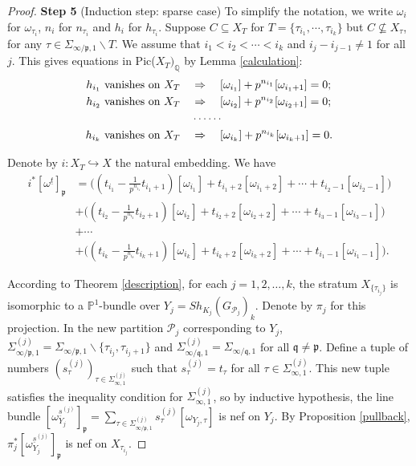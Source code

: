 \documentclass{article}
\begin{document}
\begin{proof}
\medskip
\noindent
\textbf{Step 5} (Induction step: sparse case) To simplify the notation, we write $\omega_i$ for $\omega_{\tau_i}$, $n_i$ for $n_{\tau_i}$ and $h_i$ for $h_{\tau_i}$. Suppose $C\subseteq X_T$ for $T=\{\tau_{i_1},\cdots,\tau_{i_k} \}$ but $C\nsubseteq X_\tau$, for any $\tau\in \Sigma_{\infty/\mathfrak{p},1}\backslash T$. We assume that $i_1<i_2<\cdots< i_k$ and $i_j-i_{j-1}\ne1$ for all $j$. This gives equations in Pic($X_T)_{\mathbb{Q}}$ by Lemma \ref{calculation}:
\begin{equation}
\begin{aligned}
h_{i_1}\ \textnormal{vanishes on $X_T$}\quad &\Rightarrow\quad [\omega_{i_1}]+p^{n_{i_1}}[\omega_{i_1+1}]=0;\\
h_{i_2}\ \textnormal{vanishes on $X_T$}\quad &\Rightarrow\quad [\omega_{i_2}]+p^{n_{i_2}}[\omega_{i_2+1}]=0;\\
&\cdots\cdots\\
h_{i_k}\ \textnormal{vanishes on $X_T$}\quad &\Rightarrow\quad [\omega_{i_k}]+p^{n_{i_k}}[\omega_{i_k+1}]=0.
\end{aligned}
\end{equation}

Denote by $i:X_T\hookrightarrow X$ the natural embedding. We have
\begin{equation}
\begin{aligned}
i^\ast[\omega^{\underline{t}}]_\mathfrak{p}&=\Big((t_{i_1}-\frac{1}{p^{n_{i_1}}}t_{i_1+1})[\omega_{i_1}]+t_{i_1+2}[\omega_{i_1+2}]+\cdots + t_{i_2-1}[\omega_{i_2-1}]\Big)\\
&+\Big((t_{i_2}-\frac{1}{p^{n_{i_2}}}t_{i_2+1})[\omega_{i_2}]+t_{i_2+2}[\omega_{i_2+2}]+\cdots + t_{i_3-1}[\omega_{i_3-1}]\Big)\\
&+\cdots\\
&+\Big((t_{i_k}-\frac{1}{p^{n_{i_k}}}t_{i_k+1})[\omega_{i_k}]+t_{i_k+2}[\omega_{i_k+2}]+\cdots + t_{i_1-1}[\omega_{i_1-1}]\Big).
\end{aligned}
\end{equation}

According to Theorem \ref{description}, for each $j=1,2,\dots,k$, the stratum $X_{\{\tau_{i_j}\}}$ is isomorphic to a $\mathbb{P}^1$-bundle over $Y_j=Sh_{K_j}(G_{\mathcal{P}_j})_k$. Denote by $\pi_j$ for this projection. In the new partition $\mathcal{P}_j$ corresponding to $Y_j$, $\Sigma^{(j)}_{\infty/\mathfrak{p},1}=\Sigma_{\infty/\mathfrak{p},1}\backslash\{\tau_{i_j},\tau_{i_j+1}\}$ and $\Sigma^{(j)}_{\infty/\mathfrak{q},1}=\Sigma_{\infty/\mathfrak{q},1}$ for all $\mathfrak{q}\ne \mathfrak{p}$. Define a tuple of numbers $(s^{(j)}_\tau)_{\tau\in \Sigma_{\infty,1}^{(j)}}$ such that $s^{(j)}_\tau=t_\tau$ for all $\tau\in\Sigma^{(j)}_{\infty,1}$. This new tuple satisfies the inequality condition for $\Sigma_{\infty,1}^{(j)}$, so by inductive hypothesis, the line bundle $[\omega^{{\underline{s}}^{(j)}}_{Y_j}]_{\mathfrak{p}}=\sum_{\tau\in\Sigma^{(j)}_{\infty/\mathfrak{p},1}}s^{(j)}_\tau[\omega_{Y_j,\tau}]$ is nef on $Y_j$. By Proposition \ref{pullback}, $\pi_j^\ast[\omega^{\underline{s}^{(j)}}_{Y_j}]_\mathfrak{p}$ is nef on $X_{\tau_{i_j}}$.


\end{proof}
\end{document}
